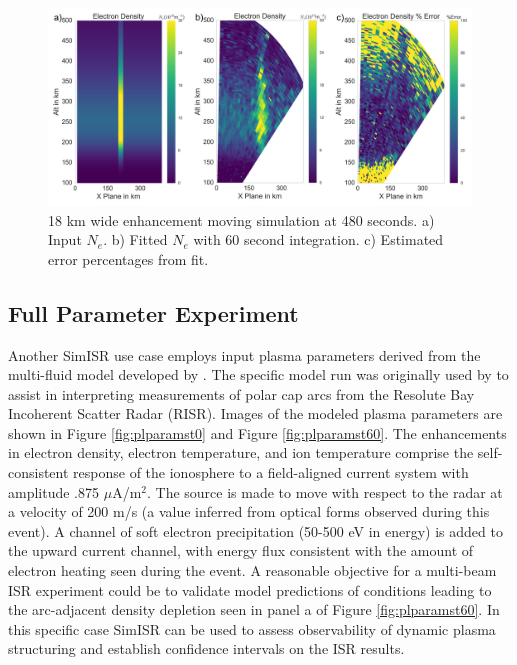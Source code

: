 \documentclass[draft,ras]{agutex}
\begin{document}
\begin{article}
\begin{figure}[!t]
\centering
\includegraphics[width=6in]{moving18kminouterr}
\caption{18 km wide enhancement moving simulation at 480 seconds. a) Input $N_e$.  b) Fitted $N_e$ with 60 second integration. c) Estimated error percentages from fit.}
\label{fig:moving18all}
\end{figure}

\subsection{Full Parameter Experiment}
\label{sec:fullparam}
Another SimISR use case employs input plasma parameters derived from the multi-fluid model developed by \citet{semeter:plasmatransport2012}. The specific model run was originally used by \citet{Perry:2015jf} to assist in interpreting measurements of polar cap arcs from the Resolute Bay Incoherent Scatter Radar (RISR). Images of the modeled plasma parameters are shown in Figure \ref{fig:plparamst0} and Figure \ref{fig:plparamst60}. The enhancements in electron density, electron temperature, and ion temperature comprise the self-consistent response of the ionosphere to a field-aligned current system with amplitude .875 $\mu$A/m$^2$.  The source is made to move with respect to the radar at a velocity of 200 m/s (a  value inferred from optical forms observed during this event).  A channel of soft electron precipitation (50-500 eV in energy) is added to the upward current channel, with energy flux consistent with the amount of electron heating seen during the event.  A reasonable objective for a multi-beam ISR experiment could be to validate model predictions of conditions leading to the arc-adjacent density depletion seen in panel a of Figure \ref{fig:plparamst60}.  In this specific case SimISR can be used to assess observability of dynamic plasma structuring and establish confidence intervals on the ISR results. 



\end{article}
\end{document}
